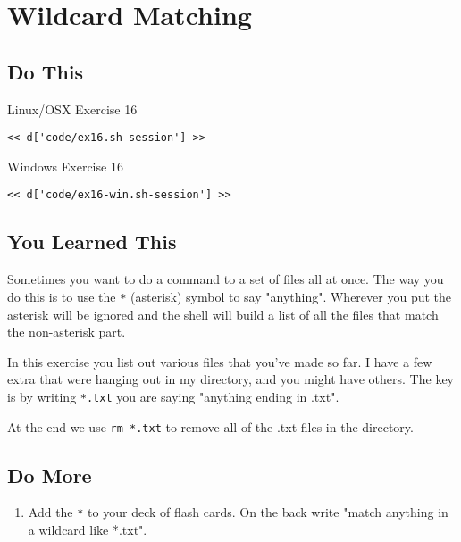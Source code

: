 \chapter{Wildcard Matching}

\section{Do This}

\begin{code}{Linux/OSX Exercise 16}
\begin{Verbatim}
<< d['code/ex16.sh-session'] >>
\end{Verbatim}
\end{code}

\begin{code}{Windows Exercise 16}
\begin{Verbatim}
<< d['code/ex16-win.sh-session'] >>
\end{Verbatim}
\end{code}

\section{You Learned This}

Sometimes you want to do a command to a set of files all at once.  The way you do
this is to use the \verb|*| (asterisk) symbol to say "anything".  Wherever you
put the asterisk will be ignored and the shell will build a list of all the files
that match the non-asterisk part.

In this exercise you list out various files that you've made so far.  I have a
few extra that were hanging out in my directory, and you might have others.  The
key is by writing \verb|*.txt| you are saying "anything ending in .txt".

At the end we use \verb|rm *.txt| to remove all of the .txt files in the
 directory.

\section{Do More}

\begin{enumerate}
\item Add the \verb|*| to your deck of flash cards.  On the back write "match anything in a wildcard like *.txt".
\end{enumerate}

